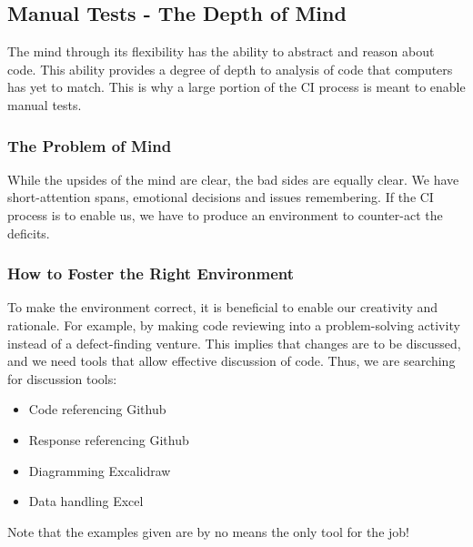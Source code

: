 \documentclass{article}
\begin{document}
\subsection{Manual Tests - The Depth of Mind}
The mind through its flexibility has the ability to abstract and reason about code.
This ability provides a degree of depth to analysis of code that computers has yet to match.
This is why a large portion of the CI process is meant to enable manual tests.

\subsubsection{The Problem of Mind}
While the upsides of the mind are clear, the bad sides are equally clear.
We have short-attention spans, emotional decisions and issues remembering.
If the CI process is to enable us, we have to produce an environment to counter-act the deficits. 

\subsubsection{How to Foster the Right Environment}
To make the environment correct, it is beneficial to enable our creativity and rationale. 
For example, by making code reviewing into a problem-solving activity instead of a defect-finding venture.
This implies that changes are to be discussed, and we need tools that allow effective discussion of code. 
Thus, we are searching for discussion tools:
\begin{itemize}
    \item Code referencing 
        Github
    \item Response referencing 
        Github
    \item Diagramming\cite{nicole_johnson_increasing_2021}
        Excalidraw
    \item Data handling
        Excel
\end{itemize}
Note that the examples given are by no means the only tool for the job! 
\end{document}
